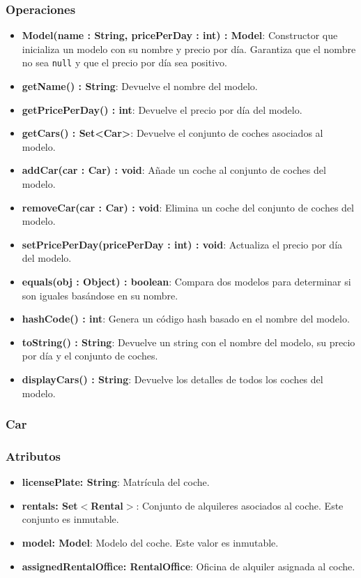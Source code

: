 \subsubsection*{Operaciones}

\begin{itemize}
    \item \textbf{Model(name : String, pricePerDay : int) : Model}: 
    Constructor que inicializa un modelo con su nombre y precio por día. Garantiza que el nombre no sea \texttt{null} y que el precio por día sea positivo.

    \item \textbf{getName() : String}: Devuelve el nombre del modelo.
    \item \textbf{getPricePerDay() : int}: Devuelve el precio por día del modelo.
    \item \textbf{getCars() : Set<Car>}: Devuelve el conjunto de coches asociados al modelo.
    \item \textbf{addCar(car : Car) : void}: Añade un coche al conjunto de coches del modelo. 
    \item \textbf{removeCar(car : Car) : void}: Elimina un coche del conjunto de coches del modelo.
    \item \textbf{setPricePerDay(pricePerDay : int) : void}: Actualiza el precio por día del modelo.
    \item \textbf{equals(obj : Object) : boolean}: Compara dos modelos para determinar si son iguales basándose en su nombre.
    \item \textbf{hashCode() : int}: Genera un código hash basado en el nombre del modelo.
    \item \textbf{toString() : String}: Devuelve un string con el nombre del modelo, su precio por día y el conjunto de coches.
    \item \textbf{displayCars() : String}: Devuelve los detalles de todos los coches del modelo.
\end{itemize}

\subsubsection{Car}

\subsubsection*{Atributos}

\begin{itemize}
    \item \textbf{licensePlate: String}: Matrícula del coche.
    \item \textbf{rentals: Set$<$Rental$>$}: Conjunto de alquileres asociados al coche. Este conjunto es inmutable.
    \item \textbf{model: Model}: Modelo del coche. Este valor es inmutable.
    \item \textbf{assignedRentalOffice: RentalOffice}: Oficina de alquiler asignada al coche.
\end{itemize}


